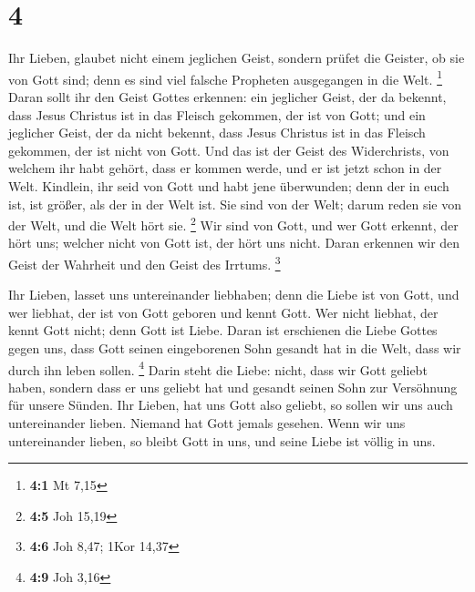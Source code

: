 \hypertarget{section-3}{%
\section{4}\label{section-3}}

 Ihr Lieben, glaubet nicht einem jeglichen Geist, sondern
prüfet die Geister, ob sie von Gott sind; denn es sind viel falsche
Propheten ausgegangen in die Welt. \footnote{\textbf{4:1} Mt 7,15}
 Daran sollt ihr den Geist Gottes erkennen: ein jeglicher
Geist, der da bekennt, dass Jesus Christus ist in das Fleisch gekommen,
der ist von Gott;  und ein jeglicher Geist, der da nicht
bekennt, dass Jesus Christus ist in das Fleisch gekommen, der ist nicht
von Gott. Und das ist der Geist des Widerchrists, von welchem ihr habt
gehört, dass er kommen werde, und er ist jetzt schon in der Welt.
 Kindlein, ihr seid von Gott und habt jene überwunden; denn
der in euch ist, ist größer, als der in der Welt ist.  Sie
sind von der Welt; darum reden sie von der Welt, und die Welt hört sie.
\footnote{\textbf{4:5} Joh 15,19}  Wir sind von Gott, und
wer Gott erkennt, der hört uns; welcher nicht von Gott ist, der hört uns
nicht. Daran erkennen wir den Geist der Wahrheit und den Geist des
Irrtums. \footnote{\textbf{4:6} Joh 8,47; 1Kor 14,37}

 Ihr Lieben, lasset uns untereinander liebhaben; denn die
Liebe ist von Gott, und wer liebhat, der ist von Gott geboren und kennt
Gott.  Wer nicht liebhat, der kennt Gott nicht; denn Gott
ist Liebe.  Daran ist erschienen die Liebe Gottes gegen uns,
dass Gott seinen eingeborenen Sohn gesandt hat in die Welt, dass wir
durch ihn leben sollen. \footnote{\textbf{4:9} Joh 3,16} 
Darin steht die Liebe: nicht, dass wir Gott geliebt haben, sondern dass
er uns geliebt hat und gesandt seinen Sohn zur Versöhnung für unsere
Sünden.  Ihr Lieben, hat uns Gott also geliebt, so sollen
wir uns auch untereinander lieben.  Niemand hat Gott jemals
gesehen. Wenn wir uns untereinander lieben, so bleibt Gott in uns, und
seine Liebe ist völlig in uns.


